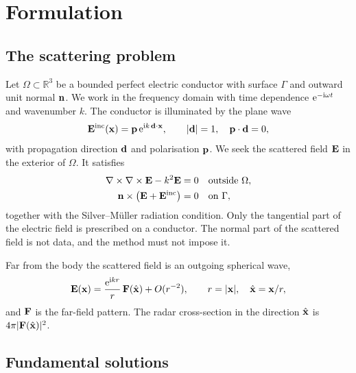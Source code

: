 \section{Formulation}
\label{sec:formulation}

\subsection{The scattering problem}

Let $\Omega\subset\mathbb{R}^3$ be a bounded perfect electric conductor with surface $\Gamma$ and outward unit normal $\mathbf{n}$. We work in the frequency domain with time dependence $\mathrm{e}^{-\mathrm{i}\omega t}$ and wavenumber $k$. The conductor is illuminated by the plane wave
\begin{equation}
  \mathbf{E}^{\mathrm{inc}}(\mathbf{x}) = \mathbf{p}\,\mathrm{e}^{\mathrm{i} k\,\mathbf{d}\cdot\mathbf{x}}, \qquad |\mathbf{d}| = 1, \quad \mathbf{p}\cdot\mathbf{d} = 0,
  \label{eq:planewave}
\end{equation}
with propagation direction $\mathbf{d}$ and polarisation $\mathbf{p}$. We seek the scattered field $\mathbf{E}$ in the exterior of $\Omega$. It satisfies \cite{colton2013,kirsch2015}
\begin{align}
  \nabla\times\nabla\times\mathbf{E} - k^2\mathbf{E} &= 0 && \text{outside } \Omega, \label{eq:maxwell}\\
  \mathbf{n}\times\bigl(\mathbf{E} + \mathbf{E}^{\mathrm{inc}}\bigr) &= 0 && \text{on } \Gamma, \label{eq:pec}
\end{align}
together with the Silver--M\"uller radiation condition. Only the tangential part of the electric field is prescribed on a conductor. The normal part of the scattered field is not data, and the method must not impose it.

Far from the body the scattered field is an outgoing spherical wave,
\begin{equation}
  \mathbf{E}(\mathbf{x}) = \frac{\mathrm{e}^{\mathrm{i} k r}}{r}\,\mathbf{F}(\hat{\mathbf{x}}) + O(r^{-2}), \qquad r = |\mathbf{x}|, \quad \hat{\mathbf{x}} = \mathbf{x}/r,
\end{equation}
and $\mathbf{F}$ is the far-field pattern. The radar cross-section in the direction $\hat{\mathbf{x}}$ is $4\pi|\mathbf{F}(\hat{\mathbf{x}})|^2$.

\subsection{Fundamental solutions}

